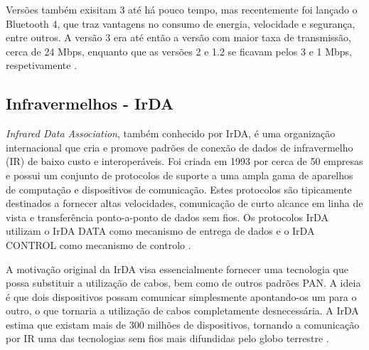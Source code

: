 \documentclass[conference]{IEEEtran}
\begin{document}
Versões também exisitam 3 até há pouco tempo, mas recentemente foi lançado o Bluetooth 4, que traz vantagens no consumo de energia, velocidade e segurança, entre outros. 
A versão 3 era até então a versão com maior taxa de transmissão, cerca de 24 Mbps, enquanto que as versões 2 e 1.2 se ficavam pelos 3 e 1 Mbps, respetivamente \cite{bluetoothwiki}.




\subsection{Infravermelhos - IrDA}

\textit{Infrared Data Association}, também conhecido por IrDA, é uma organização internacional que cria e promove padrões de conexão de dados de infravermelho (IR) de baixo custo e interoperáveis.
Foi criada em 1993 por cerca de 50 empresas e possui um conjunto de protocolos de suporte a uma ampla gama de aparelhos de computação e dispositivos de comunicação. 
Estes protocolos são tipicamente destinados a fornecer altas velocidades, comunicação de curto alcance em linha de vista e transferência ponto-a-ponto de dados sem fios. 
Os protocolos IrDA utilizam o IrDA DATA como mecanismo de entrega de dados e o IrDA CONTROL como mecanismo de controlo \cite{infareddd}.

A motivação original da IrDA visa essencialmente fornecer uma tecnologia que possa substituir a utilização de cabos, bem como de outros padrões PAN. 
A ideia é que dois dispositivos possam comunicar simplesmente apontando-os um para o outro, o que tornaria a utilização de cabos completamente desnecessária. 
A IrDA estima que existam mais de 300 milhões de dispositivos, tornando a comunicação por IR uma das tecnologias sem fios mais difundidas pelo globo terrestre \cite{wpanonline}.
\end{document}
